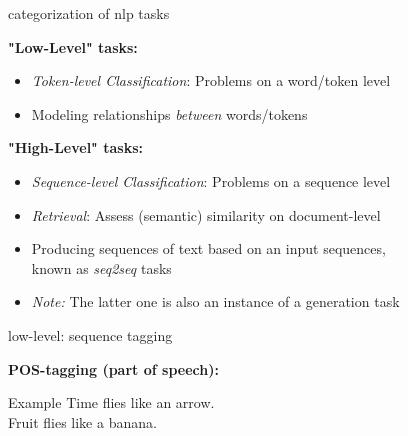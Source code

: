 \documentclass[11pt,compress,t,notes=noshow, xcolor=table]{beamer}
\begin{document}

\begin{vbframe}{categorization of nlp tasks}

\vfill

\textbf{"Low-Level" tasks:}

	\begin{itemize}
		\item \textit{Token-level Classification}: Problems on a word/token level
		\item Modeling relationships \textit{between} words/tokens %
	\end{itemize}
	
\vspace{.3cm}

\textbf{"High-Level" tasks:}

	\begin{itemize}
		\item \textit{Sequence-level Classification}: Problems on a sequence level
		\item \textit{Retrieval}: Assess (semantic) similarity on document-level
		\item Producing sequences of text based on an input sequences,\\known as \textit{seq2seq} tasks
		\item \textit{Note:} The latter one is also an instance of a generation task
	\end{itemize}

\vfill

\end{vbframe}


\begin{frame}{low-level: sequence tagging}

\vspace{1cm}

\textbf{POS-tagging (part of speech):}

\begin{exampleblock}{Example}
	Time flies   like   an   arrow.\\Fruit   flies   like   a   banana.
\end{exampleblock}

\vfill

\end{frame}
\end{document}
